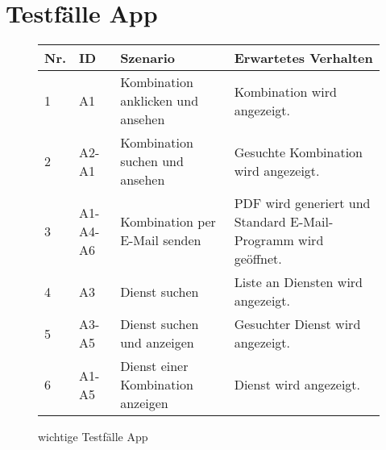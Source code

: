 \section{Testfälle App}
\begin{figure}[!h]
	\begin{center}
		\begin{tabularx}{\textwidth}{ p{} | p{} | p{} | X }
			\textbf{Nr.} & \textbf{ID} & \textbf{Szenario} & \textbf{Erwartetes Verhalten} \\ \hline
			1 & A1 & Kombination anklicken und ansehen & Kombination wird angezeigt.\\ \hline
			2 & A2-A1  & Kombination suchen und ansehen & Gesuchte Kombination wird angezeigt.\\ \hline
			3 & A1-A4-A6 & Kombination per E-Mail senden & PDF wird generiert und Standard E-Mail-Programm wird geöffnet.\\ \hline
			4 & A3 & Dienst suchen & Liste an Diensten wird angezeigt.\\ \hline
			5 & A3-A5 & Dienst suchen und anzeigen & Gesuchter Dienst wird angezeigt.\\ \hline
			6 &  A1-A5 & Dienst einer Kombination anzeigen & Dienst wird angezeigt.
			\end{tabularx}
	\end{center}
	\caption{wichtige Testfälle App}
	\label{fig:testfaelle-tabelle}
\end{figure}
